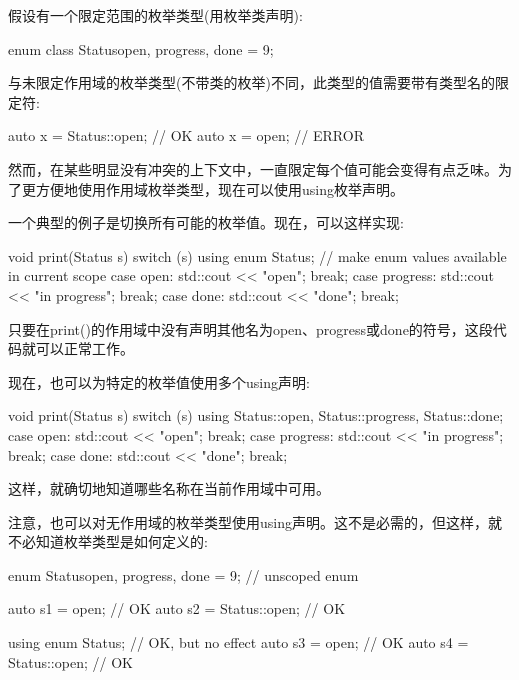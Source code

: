 

假设有一个限定范围的枚举类型(用枚举类声明):

\begin{cpp}
enum class Status{open, progress, done = 9};
\end{cpp}

与未限定作用域的枚举类型(不带类的枚举)不同，此类型的值需要带有类型名的限定符:

\begin{cpp}
auto x = Status::open; // OK
auto x = open; // ERROR
\end{cpp}

然而，在某些明显没有冲突的上下文中，一直限定每个值可能会变得有点乏味。为了更方便地使用作用域枚举类型，现在可以使用using枚举声明。

一个典型的例子是切换所有可能的枚举值。现在，可以这样实现:

\begin{cpp}
void print(Status s)
{
	switch (s) {
	using enum Status; // make enum values available in current scope
	case open:
		std::cout << "open";
		break;
	case progress:
		std::cout << "in progress";
		break;
	case done:
		std::cout << "done";
		break;
	}
}
\end{cpp}

只要在print()的作用域中没有声明其他名为open、progress或done的符号，这段代码就可以正常工作。

现在，也可以为特定的枚举值使用多个using声明:

\begin{cpp}
void print(Status s)
{
	switch (s) {
	using Status::open, Status::progress, Status::done;
	case open:
		std::cout << "open";
		break;
	case progress:
		std::cout << "in progress";
		break;
	case done:
		std::cout << "done";
		break;
	}
}
\end{cpp}

这样，就确切地知道哪些名称在当前作用域中可用。

注意，也可以对无作用域的枚举类型使用using声明。这不是必需的，但这样，就不必知道枚举类型是如何定义的:

\begin{cpp}
enum Status{open, progress, done = 9}; // unscoped enum

auto s1 = open; // OK
auto s2 = Status::open; // OK

using enum Status; // OK, but no effect
auto s3 = open; // OK
auto s4 = Status::open; // OK
\end{cpp}





